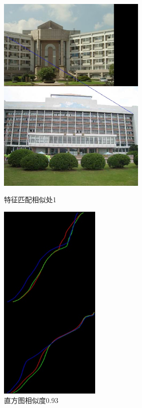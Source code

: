 \begin{figure}[htb]
\begin{minipage}[t]{0.5\linewidth}
\centering
\includegraphics[height=3.8in]{玉泉曹楼.jpg.d/im5sift.jpg}
\caption{特征匹配相似处1}
\label{fig:side:a}
\end{minipage}%
\begin{minipage}[t]{0.5\linewidth}
\centering
\includegraphics[height=3.8in]{玉泉曹楼.jpg.d/im5hist2.jpg}
\caption{直方图相似度0.93}
\label{fig:side:a}
\end{minipage}%
\end{figure}

\clearpage
